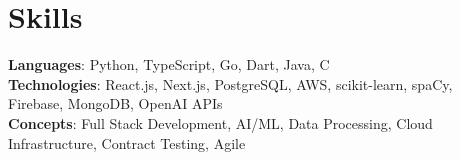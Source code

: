 \documentclass[letterpaper,11pt]{article}
\begin{document}
\section{Skills}
 \begin{itemize}[leftmargin=0.15in, label={}]
    \small{\item{
     \textbf{Languages}{: Python, TypeScript, Go, Dart, Java, C} \\
     \textbf{Technologies}{: React.js, Next.js, PostgreSQL, AWS, scikit-learn, spaCy, Firebase, MongoDB, OpenAI APIs} \\
     \textbf{Concepts}{: Full Stack Development, AI/ML, Data Processing, Cloud Infrastructure, Contract Testing, Agile} }}
 \end{itemize}

%
\end{document}
